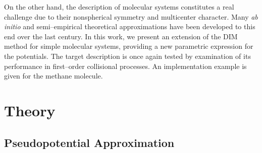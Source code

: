 \documentclass[10pt]{article}
\begin{document}
On the other hand, the description of molecular systems constitutes 
a real challenge due to their nonspherical symmetry and multicenter 
character. Many \textit{ab initio} and semi--empirical theoretical 
approximations \cite{Szabo1996,Helgaker2000,Schaefer2004} have been 
developed to this end over the last century. 
In this work, we present an extension of the DIM method for simple 
molecular systems, providing a new parametric expression for the 
potentials. 
The target description is once again tested by examination of its 
performance in first--order collisional processes. 
An implementation example is given for the methane molecule.


\section{Theory}

\subsection{Pseudopotential Approximation}
\label{sec:PPAs}
\end{document}
